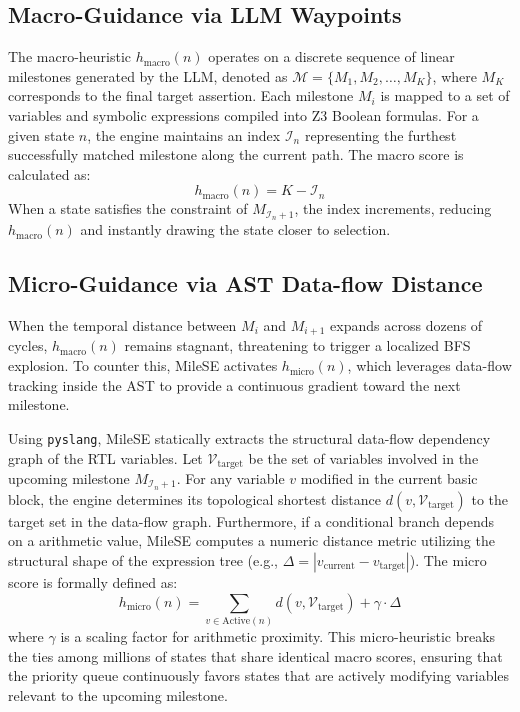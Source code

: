 \documentclass[conference]{IEEEtran}
\begin{document}
\subsection{Macro-Guidance via LLM Waypoints}
The macro-heuristic $h_{\text{macro}}(n)$ operates on a discrete sequence of linear milestones generated by the LLM, denoted as $\mathcal{M} = \{M_1, M_2, \dots, M_K\}$, where $M_K$ corresponds to the final target assertion. Each milestone $M_i$ is mapped to a set of variables and symbolic expressions compiled into Z3 Boolean formulas. For a given state $n$, the engine maintains an index $\mathcal{I}_n$ representing the furthest successfully matched milestone along the current path. The macro score is calculated as:
\begin{equation}
    h_{\text{macro}}(n) = K - \mathcal{I}_n
\end{equation}
When a state satisfies the constraint of $M_{\mathcal{I}_n + 1}$, the index increments, reducing $h_{\text{macro}}(n)$ and instantly drawing the state closer to selection.

\subsection{Micro-Guidance via AST Data-flow Distance}
When the temporal distance between $M_i$ and $M_{i+1}$ expands across dozens of cycles, $h_{\text{macro}}(n)$ remains stagnant, threatening to trigger a localized BFS explosion. To counter this, MileSE activates $h_{\text{micro}}(n)$, which leverages data-flow tracking inside the AST to provide a continuous gradient toward the next milestone.

Using \texttt{pyslang}, MileSE statically extracts the structural data-flow dependency graph of the RTL variables. Let $\mathcal{V}_{\text{target}}$ be the set of variables involved in the upcoming milestone $M_{\mathcal{I}_n + 1}$. For any variable $v$ modified in the current basic block, the engine determines its topological shortest distance $d(v, \mathcal{V}_{\text{target}})$ to the target set in the data-flow graph. Furthermore, if a conditional branch depends on a arithmetic value, MileSE computes a numeric distance metric utilizing the structural shape of the expression tree (e.g., $\Delta = |v_{\text{current}} - v_{\text{target}}|$). The micro score is formally defined as:
\begin{equation}
    h_{\text{micro}}(n) = \sum_{v \in \text{Active}(n)} d(v, \mathcal{V}_{\text{target}}) + \gamma \cdot \Delta
\end{equation}
where $\gamma$ is a scaling factor for arithmetic proximity. This micro-heuristic breaks the ties among millions of states that share identical macro scores, ensuring that the priority queue continuously favors states that are actively modifying variables relevant to the upcoming milestone.
\end{document}
